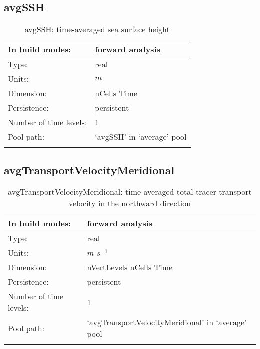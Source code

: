 \subsection[avgSSH]{avgSSH}
\label{subsec:var_sec_average_avgSSH}
\begin{center}
\begin{longtable}{| p{2.0in} | p{4.0in} |}
        \hline 
        In build modes: & \hyperref[subsec:forward_var_tab_average]{forward} \hyperref[subsec:analysis_var_tab_average]{analysis} \\
        \hline 
        Type: & real \\
        \hline 
        Units: & $m$ \\
        \hline 
        Dimension: & nCells Time \\
        \hline 
        Persistence: & persistent \\
        \hline 
        Number of time levels: & 1 \\
        \hline 
            Pool path: & `avgSSH' in `average' pool \\
		 \hline 
    \caption{avgSSH: time-averaged sea surface height}
\end{longtable}
\end{center}
\subsection[avgTransportVelocityMeridional]{avgTransportVelocityMeridional}
\label{subsec:var_sec_average_avgTransportVelocityMeridional}
\begin{center}
\begin{longtable}{| p{2.0in} | p{4.0in} |}
        \hline 
        In build modes: & \hyperref[subsec:forward_var_tab_average]{forward} \hyperref[subsec:analysis_var_tab_average]{analysis} \\
        \hline 
        Type: & real \\
        \hline 
        Units: & $m$ $s^{-1}$ \\
        \hline 
        Dimension: & nVertLevels nCells Time \\
        \hline 
        Persistence: & persistent \\
        \hline 
        Number of time levels: & 1 \\
        \hline 
            Pool path: & `avgTransportVelocityMeridional' in `average' pool \\
		 \hline 
    \caption{avgTransportVelocityMeridional: time-averaged total tracer-transport velocity in the northward direction}
\end{longtable}
\end{center}
